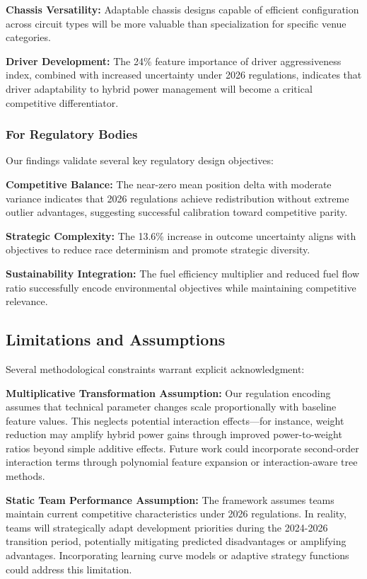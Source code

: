 \documentclass[conference]{IEEEtran}
\begin{document}
\textbf{Chassis Versatility:} Adaptable chassis designs capable of efficient configuration across circuit types will be more valuable than specialization for specific venue categories.

\textbf{Driver Development:} The 24\% feature importance of driver aggressiveness index, combined with increased uncertainty under 2026 regulations, indicates that driver adaptability to hybrid power management will become a critical competitive differentiator.

\subsubsection{For Regulatory Bodies}

Our findings validate several key regulatory design objectives:

\textbf{Competitive Balance:} The near-zero mean position delta with moderate variance indicates that 2026 regulations achieve redistribution without extreme outlier advantages, suggesting successful calibration toward competitive parity.

\textbf{Strategic Complexity:} The 13.6\% increase in outcome uncertainty aligns with objectives to reduce race determinism and promote strategic diversity.

\textbf{Sustainability Integration:} The fuel efficiency multiplier and reduced fuel flow ratio successfully encode environmental objectives while maintaining competitive relevance.

\subsection{Limitations and Assumptions}

Several methodological constraints warrant explicit acknowledgment:

\textbf{Multiplicative Transformation Assumption:} Our regulation encoding assumes that technical parameter changes scale proportionally with baseline feature values. This neglects potential interaction effects—for instance, weight reduction may amplify hybrid power gains through improved power-to-weight ratios beyond simple additive effects. Future work could incorporate second-order interaction terms through polynomial feature expansion or interaction-aware tree methods.

\textbf{Static Team Performance Assumption:} The framework assumes teams maintain current competitive characteristics under 2026 regulations. In reality, teams will strategically adapt development priorities during the 2024-2026 transition period, potentially mitigating predicted disadvantages or amplifying advantages. Incorporating learning curve models or adaptive strategy functions could address this limitation.
\end{document}
